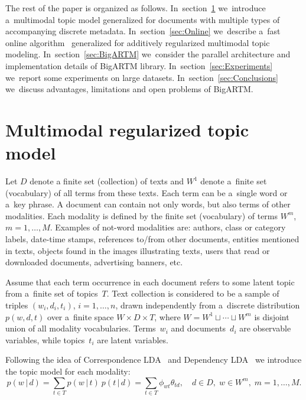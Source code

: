 \documentclass[russian]{llncs}
\newcommand{\cond}{\mspace{3mu}{|}\mspace{3mu}}
\begin{document}
The rest of the paper is organized as follows.
In~section~\ref{sec:Multimodal}
we~introduce a~multimodal topic model generalized for documents with multiple types of accompanying discrete metadata.
In~section~\ref{sec:Online}
we~describe a~fast online algorithm~\cite{hoffman10online} generalized for additively regularized multimodal topic modeling.
In~section~\ref{sec:BigARTM}
we~consider the parallel architecture and implementation details of BigARTM library.
In~section~\ref{sec:Experiments}
we~report some experiments on large datasets.
In~section~\ref{sec:Conclusions}
we~discuss advantages, limitations and open problems of BigARTM.

\section{Multimodal regularized topic model}
\label{sec:Multimodal}


Let
$D$ denote a finite set (collection) of texts and
$W^1$ denote a~finite set (vocabulary) of all terms from these texts.
Each term can be a~single word or a~key phrase.
A document can contain not only words, but also terms of other modalities.
Each modality is defined by the finite set (vocabulary) of terms $W^m$, ${m=1,\dots,M}$.
Examples of not-word modalities are:
authors,
class or category labels,
date-time stamps,
references to/from other documents,
entities mentioned in texts,
objects found in the images illustrating texts,
users that read or downloaded documents,
advertising banners,
etc.

Assume that
each term occurrence in each document refers to some latent topic from a~finite set of topics~$T$.
Text collection is considered to be a sample of triples
$(w_i,d_i,t_i)$,\; ${i=1,\dots,n}$,
drawn independently from a~discrete distribution $p(w,d,t)$ over a~finite space $W\times D \times T$,
where ${W=W^1\sqcup\cdots\sqcup W^m}$ is disjoint union of all modality vocabularies.
Terms~$w_i$ and documents~$d_i$ are observable variables,
while topics~$t_i$ are latent variables.

Following the idea of Correspondence LDA~\cite{blei03modeling}
and Dependency LDA~\cite{rubin12statistical}
we introduce the topic model for each modality:
\[
    p(w\cond d)
    = \sum_{t\in T} p(w\cond t)\: p(t\cond d)
    = \sum_{t\in T} \phi_{wt} \theta_{td},
    \quad
    d\in D,\; w\in W^m,\; m=1,\dots,M.
\]
\end{document}
